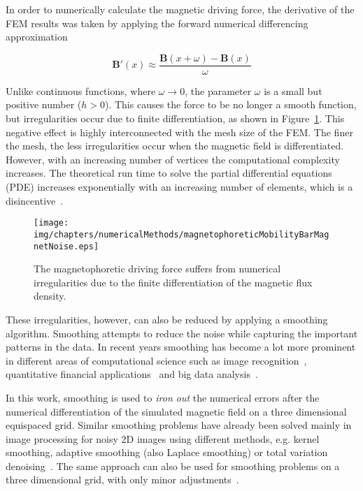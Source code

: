 In order to numerically calculate the magnetic driving force, the derivative of the FEM results was taken by applying the forward numerical differencing approximation~\cite{Burden2001}

\begin{equation}
 	\mathbf{B}'(x) \approx \frac{\mathbf{B}(x+\omega)-\mathbf{B}(x)}{\omega}
 	\label{eqn:nummericalDifferentiation}
\end{equation} 

Unlike continuous functions, where $\omega\rightarrow 0$, the parameter $\omega$ is a small but positive number ($h>0$). This causes the force to be no longer a smooth function, but irregularities occur due to finite differentiation, as shown in Figure~\ref{fig:magnetophoreticMobilityBarMagnetNoise}. This negative effect is highly interconnected with the mesh size of the FEM. The finer the mesh, the less irregularities occur when the magnetic field is differentiated. However, with an increasing number of vertices the computational complexity increases. The theoretical run time to solve the partial differential equations (PDE) increases exponentially with an increasing number of elements, which is a disincentive~\cite{Johnson2004}.

\begin{figure}[htb]
        \centering
        \texttt{[image: img/chapters/numericalMethods/magnetophoreticMobilityBarMagnetNoise.eps]}
        \caption[Numerical magnetophoretic driving force]{The magnetophoretic driving force suffers from numerical irregularities due to the finite differentiation of the magnetic flux density.}
        \label{fig:magnetophoreticMobilityBarMagnetNoise}
\end{figure}

These irregularities, however, can also be reduced by applying a smoothing algorithm. Smoothing attempts to reduce the noise while capturing the important patterns in the data. In recent years smoothing has become a lot more prominent in different areas of computational science such as image recognition~\cite{Jain1989}, quantitative financial applications~\cite{Gencay2001} and big data analysis~\cite{Kantardzic2011}. 

In this work, smoothing is used to \textit{iron out} the numerical errors after the numerical differentiation of the simulated magnetic field on a three dimensional equispaced grid. Similar smoothing problems have already been solved mainly in image processing for noisy 2D images using different methods, e.g. kernel smoothing, adaptive smoothing (also Laplace smoothing) or total variation denoising~\cite{Jain1989,Buades2005}. The same approach can also be used for smoothing problems on a three dimensional grid, with only minor adjustments~\cite{Eubank1999,Takezawa2005}.


